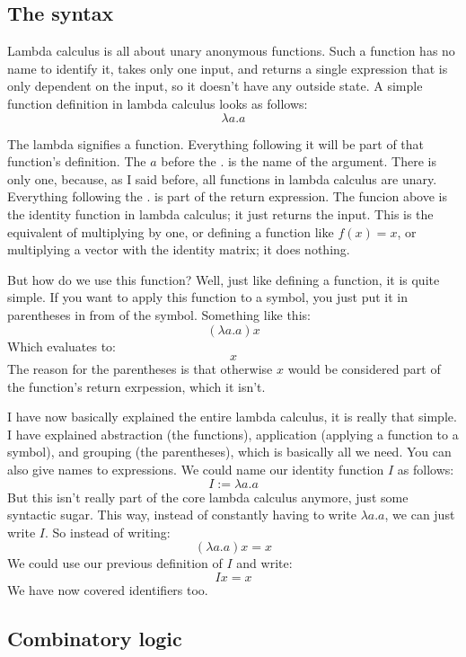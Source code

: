 \documentclass[a4paper, 11pt]{article}
\begin{document}

\subsection{The syntax}

Lambda calculus is all about unary anonymous functions. Such a function has no
name to identify it, takes only one input, and returns a single expression that
is only dependent on the input, so it doesn't have any outside state. A simple
function definition in lambda calculus looks as follows:
\[\lambda a.a\]

The lambda signifies a function. Everything following it will be part of that
function's definition. The \(a\) before the \(.\) is the name of the argument.
There is only one, because, as I said before, all functions in lambda calculus
are unary. Everything following the \(.\) is part of the return expression. The
funcion above is the identity function in lambda calculus; it just returns the
input. This is the equivalent of multiplying by one, or defining a function
like \(f(x)=x\), or multiplying a vector with the identity matrix; it does
nothing.

But how do we use this function? Well, just like defining a function, it is
quite simple. If you want to apply this function to a symbol, you just put it
in parentheses in from of the symbol. Something like this:
\[(\lambda a.a)x\]
Which evaluates to:
\[x\]
The reason for the parentheses is that otherwise \(x\) would be considered part
of the function's return exrpession, which it isn't.

I have now basically explained the entire lambda calculus, it is really that
simple. I have explained abstraction (the functions), application (applying a
function to a symbol), and grouping (the parentheses), which is basically all
we need. You can also give names to expressions. We could name our identity
function \(I\) as follows: \[I:=\lambda a.a\] But this isn't really part of the
core lambda calculus anymore, just some syntactic sugar. This way, instead of
constantly having to write \(\lambda a.a\), we can just write \(I\). So instead
of writing:
\[(\lambda a.a)x=x\]
We could use our previous definition of \(I\) and write:
\[Ix=x\]
We have now covered identifiers too.

\subsection{Combinatory logic}

\end{document}

